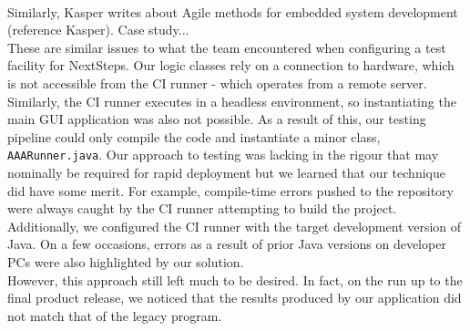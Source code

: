 \documentclass{l3proj}
\begin{document}
\\ Similarly, Kasper writes about Agile methods for embedded system development (reference Kasper). 
Case study...
\\ These are similar issues to what the team encountered when configuring a test facility for NextSteps. 
Our logic classes rely on a connection to hardware, which is not accessible from the CI runner - which operates from a remote server. 
Similarly, the CI runner executes in a headless environment, so instantiating the main GUI application was also not possible. 
As a result of this, our testing pipeline could only compile the code and instantiate a minor class, \verb|AAARunner.java|. Our approach to testing was lacking in the rigour that may nominally be required for rapid deployment but we learned that our technique did have some merit. For example, compile-time errors pushed to the repository were always caught by the CI runner attempting to build the project. 
 Additionally, we configured the CI runner with the target development version of Java. On a few occasions, errors as a result of prior Java versions on developer PCs were also highlighted by our solution. 
\\However, this approach still left much to be desired. In fact, on the run up to the final product release, we noticed that the results produced by our application did not match that of the legacy program. 
\end{document}
